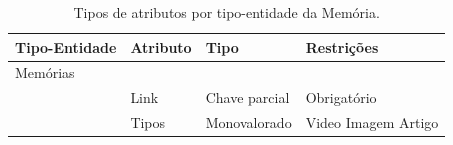 \documentclass[11pt]{../../classes/ifscarticle}
\begin{document}
\begin{table}[h]
    \centering
    \vspace{0.5cm}
    \begin{tabular}{ |p{}|p{3cm}|p{4cm}|p{}|  }
        Tipo-Entidade & Atributo & Tipo          & Restrições                                \\ %

        \hline
        Memórias
                      &          &               &                                           \\
                      & Link     & Chave parcial & Obrigatório    \linebreak                 \\
                      & Tipos    & Monovalorado  & Video \linebreak Imagem \linebreak Artigo \\

        \hline
    \end{tabular}
    \caption{Tipos de atributos por tipo-entidade da Memória.}
\end{table}
\end{document}
